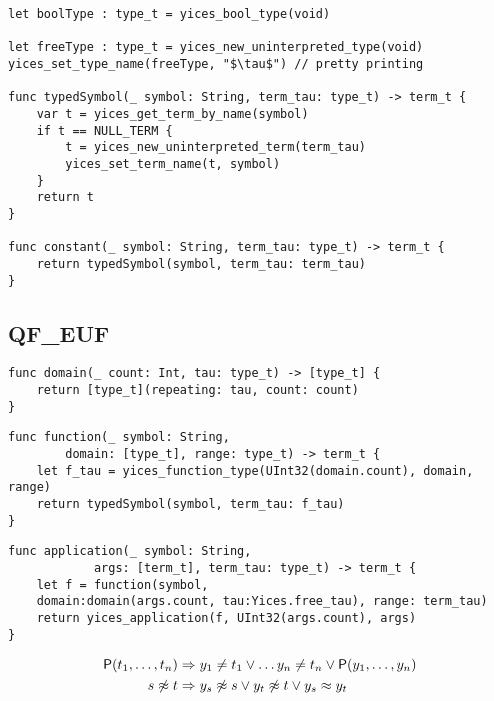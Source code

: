 \begin{lstlisting}[language=flea, caption={Yices types, symbols, and constants}]
let boolType : type_t = yices_bool_type(void)

let freeType : type_t = yices_new_uninterpreted_type(void)
yices_set_type_name(freeType, "$\tau$") // pretty printing

func typedSymbol(_ symbol: String, term_tau: type_t) -> term_t {
	var t = yices_get_term_by_name(symbol)
	if t == NULL_TERM {
		t = yices_new_uninterpreted_term(term_tau)
		yices_set_term_name(t, symbol)
	}
	return t
}

func constant(_ symbol: String, term_tau: type_t) -> term_t {
	return typedSymbol(symbol, term_tau: term_tau)
}
\end{lstlisting}




\subsection{QF\_EUF}

\begin{lstlisting}[language=flea]
func domain(_ count: Int, tau: type_t) -> [type_t] {
	return [type_t](repeating: tau, count: count)
}
\end{lstlisting}

\begin{lstlisting}[language=flea]
func function(_ symbol: String,
		domain: [type_t], range: type_t) -> term_t {
	let f_tau = yices_function_type(UInt32(domain.count), domain, range)
	return typedSymbol(symbol, term_tau: f_tau)
}
\end{lstlisting}

\begin{lstlisting}[language=flea]
func application(_ symbol: String,
			args: [term_t], term_tau: type_t) -> term_t {
	let f = function(symbol,
	domain:domain(args.count, tau:Yices.free_tau), range: term_tau)
	return yices_application(f, UInt32(args.count), args)
}
\end{lstlisting}


\begin{definition}

	\end{definition}

\begin{example}
	\begin{align*}
	\mathsf{P}(t_1,\ldots, t_n) &\Rightarrow y_1\neq t_1 \lor \ldots y_n\neq t_n \lor \mathsf{P}(y_1,\ldots,y_n) \\
	s \not\approx t &\Rightarrow y_s\not\approx s\lor y_t\not\approx t \lor y_s \approx y_t \\
	\end{align*}
	\end{example}








